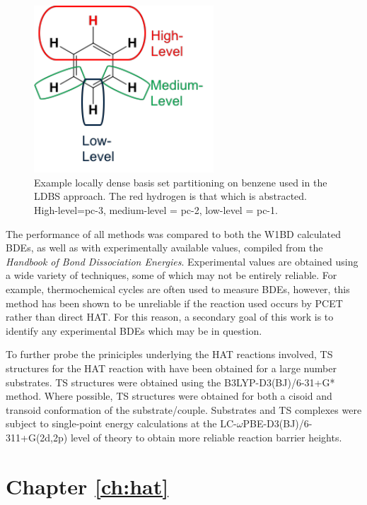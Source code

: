 \begin{figure}[htb]
  \centering
  \includegraphics[width=0.6\textwidth]{figures/ldbs}
  \caption[Example locally dense basis set partitioning on benzene used in the
  LDBS approach.]{Example locally dense basis set partitioning on benzene used
    in the LDBS approach. The red hydrogen is that which is
    abstracted. High-level=pc-3, medium-level = pc-2, low-level = pc-1.}
  \label{fig:ldbs}
\end{figure}


The performance of all methods was compared to both the W1BD calculated BDEs, as
well as with experimentally available values, compiled from the \emph{Handbook
  of Bond Dissociation Energies}.\cite{Luo2002} Experimental values are obtained
using a wide variety of techniques, some of which may not be entirely
reliable. For example, thermochemical cycles\cite{Bordwell1988} are often used
to measure BDEs, however, this method has been shown to be unreliable if the
reaction used occurs by PCET rather than direct HAT.\cite{Miller2016} For this
reason, a secondary goal of this work is to identify any experimental BDEs which
may be in question.

To further probe the priniciples underlying the HAT reactions involved, TS
structures for the HAT reaction with \cumo have been obtained for a large number
substrates. TS structures were obtained using the B3LYP-D3(BJ)/6-31+G*
method. Where possible, TS structures were obtained for both a cisoid and
transoid conformation of the substrate/\cumo couple. Substrates and TS complexes
were subject to single-point energy calculations at the
LC-$\omega$PBE-D3(BJ)/6-311+G(2d,2p) level of theory to obtain more reliable
reaction barrier heights.

\section{Chapter \ref{ch:hat}}

